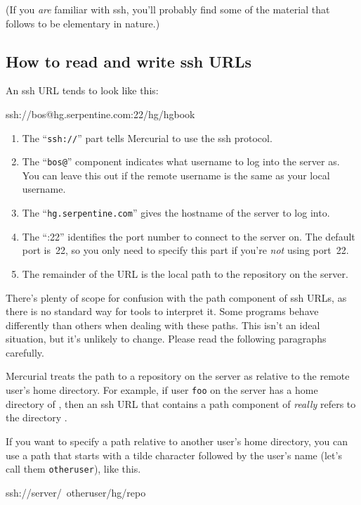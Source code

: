 (If you \emph{are} familiar with ssh, you'll probably find some of the
material that follows to be elementary in nature.)

\subsection{How to read and write ssh URLs}

An ssh URL tends to look like this:
\begin{codesample2}
  ssh://bos@hg.serpentine.com:22/hg/hgbook
\end{codesample2}
\begin{enumerate}
\item The ``\texttt{ssh://}'' part tells Mercurial to use the ssh
  protocol.
\item The ``\texttt{bos@}'' component indicates what username to log
  into the server as.  You can leave this out if the remote username
  is the same as your local username.
\item The ``\texttt{hg.serpentine.com}'' gives the hostname of the
  server to log into.
\item The ``:22'' identifies the port number to connect to the server
  on.  The default port is~22, so you only need to specify this part
  if you're \emph{not} using port~22.
\item The remainder of the URL is the local path to the repository on
  the server.
\end{enumerate}

There's plenty of scope for confusion with the path component of ssh
URLs, as there is no standard way for tools to interpret it.  Some
programs behave differently than others when dealing with these paths.
This isn't an ideal situation, but it's unlikely to change.  Please
read the following paragraphs carefully.

Mercurial treats the path to a repository on the server as relative to
the remote user's home directory.  For example, if user \texttt{foo}
on the server has a home directory of , then an ssh
URL that contains a path component of 
\emph{really} refers to the directory .

If you want to specify a path relative to another user's home
directory, you can use a path that starts with a tilde character
followed by the user's name (let's call them \texttt{otheruser}), like
this.
\begin{codesample2}
  ssh://server/~otheruser/hg/repo
\end{codesample2}

